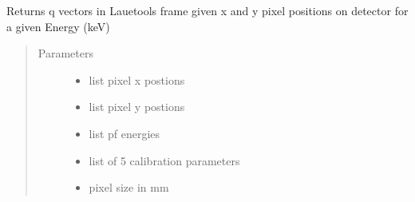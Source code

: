 \documentclass[letterpaper,10pt,english]{sphinxmanual}
\begin{document}

\begin{fulllineitems}
\label{\detokenize{Simulation_Module:LaueTools.LaueGeometry.qvector_from_xy_E}}
Returns q vectors in Lauetools frame given x and y pixel positions on detector
for a given Energy (keV)
\begin{quote}\begin{description}
\item[{Parameters}] \leavevmode\begin{itemize}
\item {} 
 \textendash{} list pixel x postions

\item {} 
 \textendash{} list pixel y postions

\item {} 
 \textendash{} list pf energies

\item {} 
 \textendash{} list of 5 calibration parameters

\item {} 
 \textendash{} pixel size in mm

\end{itemize}

\end{description}\end{quote}

\end{fulllineitems}

\end{document}
